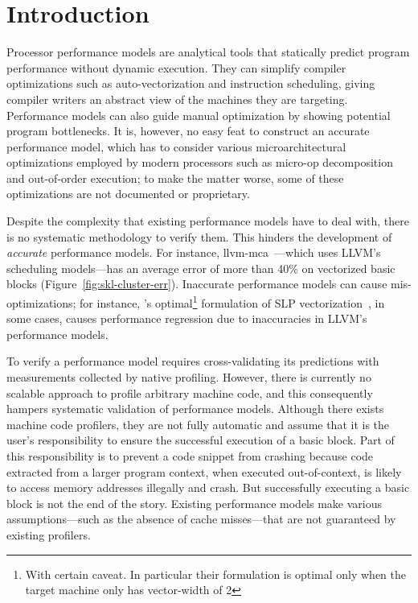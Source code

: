 \section{Introduction}
Processor performance models are analytical tools that statically predict
program performance without dynamic execution.
They can simplify compiler optimizations such as
auto-vectorization and instruction scheduling,
giving compiler writers an abstract view of the machines they are targeting.
Performance models can also guide manual optimization by showing
potential program bottlenecks.
It is, however, no easy feat to construct an accurate performance model,
which has to consider various microarchitectural optimizations employed by
modern processors such as micro-op decomposition and out-of-order execution;
to make the matter worse, some of these optimizations 
are not documented or proprietary.

Despite the complexity that existing performance models have to deal with,
there is no systematic methodology to verify them. 
This hinders the development of \emph{accurate} performance models.
For instance, llvm-mca~\cite{llvm-mca}---which uses 
LLVM's scheduling models---has an average error of more than 40\% on vectorized
basic blocks (Figure~\ref{fig:skl-cluster-err}).
Inaccurate performance models can cause mis-optimizations;
for instance, \cite{goslp}'s optimal\footnote{
With certain caveat.
In particular their formulation is optimal only when the target machine only has vector-width of 2} 
formulation of SLP vectorization~\cite{slp},
in some cases, causes performance regression due to inaccuracies in LLVM's~\cite{llvm} performance models.


To verify a performance model
requires cross-validating its predictions with
measurements collected by native profiling.
However, there is currently no scalable approach 
to profile arbitrary machine code, and this consequently
hampers systematic validation of performance models.
Although there exists machine code profilers, 
they are not fully automatic and
assume that it is the user's responsibility to ensure
the successful execution of a basic block.
Part of this responsibility is to prevent a code snippet from crashing because 
code extracted from a larger program context, when executed
out-of-context, is likely to access memory addresses illegally and crash.
But successfully executing a basic block is not the end of the story.
Existing performance models make various assumptions---such as the absence of
cache misses---that are not guaranteed by existing profilers.

